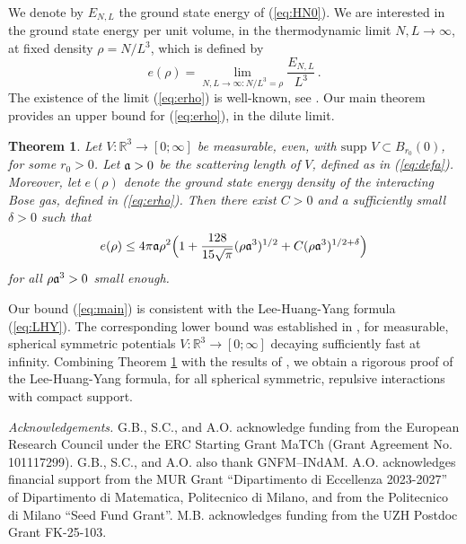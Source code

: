 \documentclass[a4paper,11pt]{article}
\def\bR{\mathbb{R}}
\newtheorem{theorem}{Theorem}[section]  %
\numberwithin{equation}{section}
\begin{document}
We denote by $E_{N,L}$ the ground state energy of (\ref{eq:HN0}). We are interested in the ground state energy per unit volume, in the thermodynamic limit $N, L \to \infty$, at fixed density $\rho = N / L^3$, which is defined by 
\begin{equation}\label{eq:erho} 
e (\rho) = \lim_{N,L \to \infty : N/ L^3 = \rho} \frac{E_{N,L}}{L^3}  \, . 
\end{equation} 
The existence of the limit (\ref{eq:erho}) is well-known, see \cite{R}. Our main theorem provides an upper bound for (\ref{eq:erho}), in the dilute limit. 
\begin{theorem}\label{thm:main}
Let $V : \bR^3 \to [0;\infty]$ be measurable, even, with $\text{supp } V \subset B_{r_0} (0)$, for some $r_0 > 0$. Let $\frak{a} > 0$ be the scattering length of $V$, defined as in (\ref{eq:defa}). Moreover, let $e(\rho)$ denote the ground state energy density of the interacting Bose gas, defined in (\ref{eq:erho}). Then there exist $C > 0$ and a sufficiently small $\delta > 0$ such that 
\begin{equation}\label{eq:main} e(\rho) \leq 4\pi \frak{a} \rho^2 \Big( 1+ \frac{128}{15 \sqrt{\pi}} (\rho \frak{a}^3)^{1/2} + C (\rho \frak{a}^3)^{1/2+\delta} \Big) \end{equation} 
for all $\rho \frak{a}^3 > 0$ small enough. 
\end{theorem}

Our bound (\ref{eq:main}) is consistent with the Lee-Huang-Yang formula (\ref{eq:LHY}). The corresponding lower bound was established in \cite{FS2}, for measurable, spherical symmetric potentials $V : \bR^3 \to [0;\infty]$ decaying sufficiently fast at infinity. Combining Theorem \ref{thm:main} with the results of \cite{FS2}, we obtain a rigorous proof of the Lee-Huang-Yang formula, for all spherical symmetric, repulsive interactions with compact support. 


\medskip

{\it Acknowledgements.} G.B., S.C., and A.O. acknowledge funding from the European Research Council under the ERC Starting Grant MaTCh (Grant Agreement No. 101117299). G.B., S.C., and A.O. also thank GNFM–INdAM.
A.O. acknowledges financial support from the MUR Grant “Dipartimento di Eccellenza 2023-2027” of Dipartimento di Matematica, Politecnico di Milano, and from the Politecnico di Milano ``Seed Fund Grant''. M.B. acknowledges funding from the UZH Postdoc Grant FK-25-103.
\end{document}
